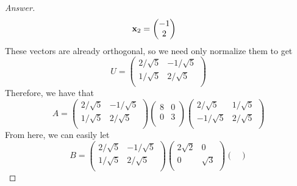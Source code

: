\documentclass[../psets.tex]{subfiles}
\begin{document}
\begin{enumerate}[label={\textbf{2.\arabic*.}}]
\begin{proof}[Answer]
\begin{align*}
            \mathbf{x}_2 &=
            \begin{pmatrix}
                -1\\
                2\\
            \end{pmatrix}
        \end{align*}
        These vectors are already orthogonal, so we need only normalize them to get
        \begin{equation*}
            U =
            \begin{pmatrix}
                2/\sqrt{5} & -1/\sqrt{5}\\
                1/\sqrt{5} & 2/\sqrt{5}\\
            \end{pmatrix}
        \end{equation*}
        Therefore, we have that
        \begin{equation*}
            A =
            \begin{pmatrix}
                2/\sqrt{5} & -1/\sqrt{5}\\
                1/\sqrt{5} & 2/\sqrt{5}\\
            \end{pmatrix}
            \begin{pmatrix}
                8 & 0\\
                0 & 3\\
            \end{pmatrix}
            \begin{pmatrix}
                2/\sqrt{5} & 1/\sqrt{5}\\
                -1/\sqrt{5} & 2/\sqrt{5}\\
            \end{pmatrix}
        \end{equation*}
        From here, we can easily let
        \begin{equation*}
            B =
            \begin{pmatrix}
                2/\sqrt{5} & -1/\sqrt{5}\\
                1/\sqrt{5} & 2/\sqrt{5}\\
            \end{pmatrix}
            \begin{pmatrix}
                2\sqrt{2} & 0\\
                0 & \sqrt{3}\\
            \end{pmatrix}
            \begin{pmatrix}

\end{pmatrix}
\end{equation*}
\end{proof}
\end{enumerate}
\end{document}
